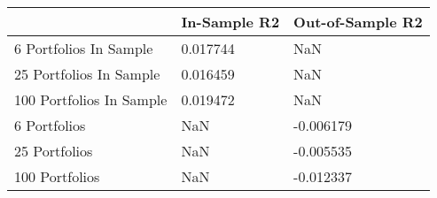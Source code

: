 \begin{tabular}{lll}
\toprule
 & In-Sample R2 & Out-of-Sample R2 \\
\midrule
6 Portfolios In Sample & 0.017744 & NaN \\
25 Portfolios In Sample & 0.016459 & NaN \\
100 Portfolios In Sample & 0.019472 & NaN \\
6 Portfolios & NaN & -0.006179 \\
25 Portfolios & NaN & -0.005535 \\
100 Portfolios & NaN & -0.012337 \\
\bottomrule
\end{tabular}
